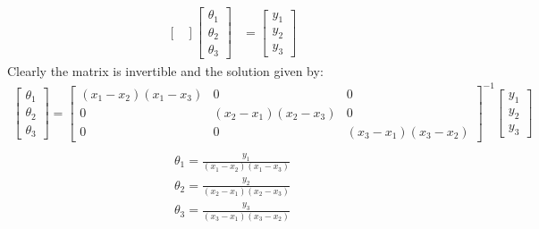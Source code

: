 \documentclass[answers,12pt,addpoints]{exam}
\begin{document}
\begin{questions}
\begin{solution}
\begin{align*}
\begin{bmatrix}
            \end{bmatrix}
            \begin{bmatrix}
                \theta_1\\
                \theta_2\\
                \theta_3
            \end{bmatrix}
            &=
            \begin{bmatrix}
                y_1\\
                y_2\\
                y_3
            \end{bmatrix}
        \end{align*}
        Clearly the matrix is invertible and the solution given by:
        \begin{align*}
            \begin{bmatrix}
                \theta_1\\
                \theta_2\\
                \theta_3
            \end{bmatrix} = 
            \begin{bmatrix}
                (x_1 - x_2)(x_1 - x_3) & 0 & 0\\
                0 & (x_2 - x_1)(x_2 - x_3) & 0\\
                0 & 0 & (x_3 - x_1)(x_3 - x_2)
            \end{bmatrix}^{-1}
            \begin{bmatrix}
                y_1\\
                y_2\\
                y_3
            \end{bmatrix}\\
        \end{align*}
        \begin{align*}
            \theta_1 = \frac{y_1}{(x_1 - x_2)(x_1 - x_3)}\\
            \theta_2 = \frac{y_2}{(x_2 - x_1)(x_2 - x_3)}\\
            \theta_3 = \frac{y_3}{(x_3 - x_1)(x_3 - x_2)}
        \end{align*}
    \end{solution}    
\end{questions}
\end{document}
